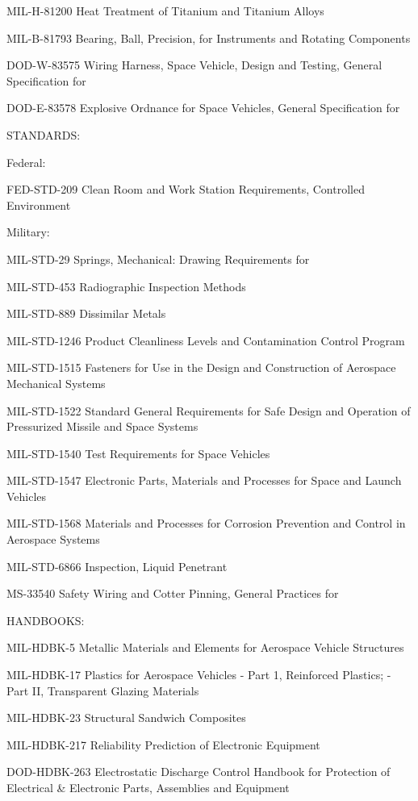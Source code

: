 \documentclass[12pt]{article}
\begin{document}
MIL-H-81200 Heat Treatment of Titanium and Titanium Alloys

MIL-B-81793 Bearing, Ball, Precision, for Instruments and Rotating Components

DOD-W-83575 Wiring Harness, Space Vehicle, Design and Testing, General Specification for

DOD-E-83578 Explosive Ordnance for Space Vehicles, General Specification for

STANDARDS:

Federal:

FED-STD-209 Clean Room and Work Station Requirements, Controlled Environment

Military:

MIL-STD-29 Springs, Mechanical: Drawing Requirements for

MIL-STD-453 Radiographic Inspection Methods

MIL-STD-889 Dissimilar Metals

MIL-STD-1246 Product Cleanliness Levels and Contamination Control Program

MIL-STD-1515 Fasteners for Use in the Design and Construction of Aerospace Mechanical Systems

MIL-STD-1522 Standard General Requirements for Safe Design and Operation of Pressurized Missile and Space Systems

MIL-STD-1540 Test Requirements for Space Vehicles

MIL-STD-1547 Electronic Parts, Materials and Processes for Space and Launch Vehicles

MIL-STD-1568 Materials and Processes for Corrosion Prevention and Control in Aerospace Systems

MIL-STD-6866 Inspection, Liquid Penetrant

MS-33540 Safety Wiring and Cotter Pinning, General Practices for

HANDBOOKS:

MIL-HDBK-5 Metallic Materials and Elements for Aerospace Vehicle Structures

MIL-HDBK-17 Plastics for Aerospace Vehicles - Part 1, Reinforced Plastics; - Part II, Transparent Glazing Materials

MIL-HDBK-23 Structural Sandwich Composites

MIL-HDBK-217 Reliability Prediction of Electronic Equipment

DOD-HDBK-263 Electrostatic Discharge Control Handbook for Protection of Electrical \& Electronic Parts, Assemblies and Equipment
\end{document}
